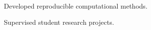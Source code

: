 \documentclass{careerdossier-cv}
\begin{document}
\MakeCDossierHeader
{}
\begin{CDossierEntry}[title = {Research Fellow}, organization = {Example Institute}, location = {Toronto, ON}, dates = {2024--Present}]
  \begin{CDossierItemize}
    \item Developed reproducible computational methods.
    \item Supervised student research projects.
  \end{CDossierItemize}
\end{CDossierEntry}
\end{document}
